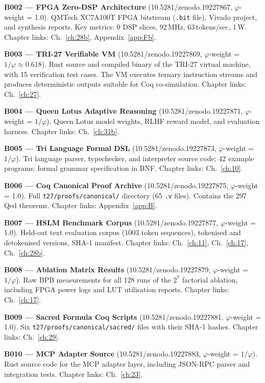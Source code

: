 \textbf{B002 --- FPGA Zero-DSP Architecture} (10.5281/zenodo.19227867, $\varphi$-weight = 1.0).
QMTech XC7A100T FPGA bitstream (\texttt{.bit} file), Vivado project, and synthesis reports. Key metrics: 0 DSP slices, 92\,MHz, 63\,tokens/sec, 1\,W. Chapter links: Ch.~\ref{ch:28b}, Appendix~\ref{app:Fb}.

\textbf{B003 --- TRI-27 Verifiable VM} (10.5281/zenodo.19227869, $\varphi$-weight = $1/\varphi \approx 0.618$).
Rust source and compiled binary of the TRI-27 virtual machine, with 15 verification test cases. The VM executes ternary instruction streams and produces deterministic outputs suitable for Coq co-simulation. Chapter links: Ch.~\ref{ch:27}.

\textbf{B004 --- Queen Lotus Adaptive Reasoning} (10.5281/zenodo.19227871, $\varphi$-weight = $1/\varphi$).
Queen Lotus model weights, RLHF reward model, and evaluation harness. Chapter links: Ch.~\ref{ch:31b}.

\textbf{B005 --- Tri Language Formal DSL} (10.5281/zenodo.19227873, $\varphi$-weight = $1/\varphi$).
Tri language parser, typechecker, and interpreter source code; 42 example programs; formal grammar specification in BNF. Chapter links: Ch.~\ref{ch:10}.

\textbf{B006 --- Coq Canonical Proof Archive} (10.5281/zenodo.19227875, $\varphi$-weight = 1.0).
Full \texttt{t27/proofs/canonical/} directory (65 \texttt{.v} files). Contains the 297 Qed theorems. Chapter links: Appendix~\ref{app:B}.

\textbf{B007 --- HSLM Benchmark Corpus} (10.5281/zenodo.19227877, $\varphi$-weight = 1.0).
Held-out text evaluation corpus (1003 token sequences), tokenised and detokenised versions, SHA-1 manifest. Chapter links: Ch.~\ref{ch:11}, Ch.~\ref{ch:17}, Ch.~\ref{ch:28b}.

\textbf{B008 --- Ablation Matrix Results} (10.5281/zenodo.19227879, $\varphi$-weight = $1/\varphi$).
Raw BPB measurements for all 128 runs of the $2^7$ factorial ablation, including FPGA power logs and LUT utilisation reports. Chapter links: Ch.~\ref{ch:17}.

\textbf{B009 --- Sacred Formula Coq Scripts} (10.5281/zenodo.19227881, $\varphi$-weight = 1.0).
Six \texttt{t27/proofs/canonical/sacred/} files with their SHA-1 hashes. Chapter links: Ch.~\ref{ch:29}.

\textbf{B010 --- MCP Adapter Source} (10.5281/zenodo.19227883, $\varphi$-weight = $1/\varphi$).
Rust source code for the MCP adapter layer, including JSON-RPC parser and integration tests. Chapter links: Ch.~\ref{ch:23}.

